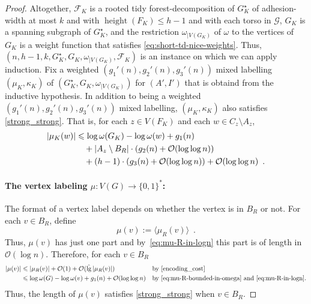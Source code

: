 \documentclass{patmorin}
\let\eqref\cref
\renewcommand{\le}{\leqslant}
\renewcommand{\leq}{\leqslant}
\DeclareMathOperator{\height}{height}
\DeclareMathOperator{\lgg}{\hat{lg}}
\newcommand{\Oh}{\mathcal{O}}
\begin{document}
\begin{proof}
    Altogether, $\mathcal{F}_K$ is a rooted tidy forest-decomposition of $G^\star_K$ of adhesion-width at most $k$ and with $\height(F_K)\le h-1$ and with each torso in $\mathcal{G}$, $G_K$ is a spanning subgraph of $G^\star_K$, and the restriction
    $\omega_{|V(G_K)}$ of $\omega$ to the vertices of $G_K$ is a weight function that satisfies \eqref{eq:short-td-nice-weights}.  Thus, $(n,h-1,k,G^\star_K,G_K,\omega_{|V(G_K)},\mathcal{F}_K)$ is an instance on which we can apply induction.
    Fix a weighted $(g_1'(n),g_2'(n),g_3'(n))$ mixed labelling $(\mu_K,\kappa_K)$ of $(G^\star_K,G_K,\omega_{|V(G_K)})$ for $(A',I')$ that is obtaind from the inductive hypothesis.
    In addition to being a weighted $(g_1'(n),g_2'(n),g_3'(n))$ mixed labelling, $(\mu_K,\kappa_K)$ also satisfies \eqref{strong_strong}.  That is, for each $z\in V(F_K)$ and each $w\in C_z\setminus A_z$,
    \begin{align}
       |\mu_K(w)| & \le \log \omega(G_K) - \log\omega(w) + g_1(n) \notag \\
       & \quad {} + |A_z\setminus B_R|\cdot (g_2(n) + \Oh(\log\log n)) \label{mu_Kw} \\
       & \quad {} + (h-1)\cdot (g_3(n) + \Oh(\log\log n)) +\Oh(\log\log n) \enspace . \notag
    \end{align}

    \paragraph{\boldmath The vertex labeling $\mu:V(G)\to\{0,1\}^*$:}
    The format of a vertex label depends on whether the vertex is in $B_R$ or not.
        For each $v\in B_R$, define
    \[
      \mu(v) := \langle\mu_R(v)\rangle\enspace.
    \]
    Thus, $\mu(v)$ has just one part and
    by~\eqref{eq:mu-R-in-logn} this part is of length in $\Oh(\log n)$.
    Therefore,
    for each $v\in B_R$
    \begin{align*}
    |\mu(v)| &\leq |\mu_R(v)| + \Oh(1) + \Oh(\lgg|\mu_R(v)|) &&\text{by~\eqref{encoding_cost}}\\
    &\leq \log\omega(G) - \log\omega(v) + g_1(n) + \Oh(\log\log n)&&\textrm{by~\eqref{eq:mu-R-bounded-in-omega} and~\eqref{eq:mu-R-in-logn}.}
    \end{align*}
    Thus, the length of $\mu(v)$ satisfies \eqref{strong_strong} when $v\in B_R$.



\end{proof}
\end{document}

